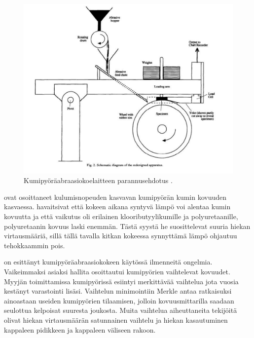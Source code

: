 \documentclass[12pt,a4paper,finnish]{tutthesis}
\begin{document}
\begin{figure}
  \begin{center}
    \includegraphics[scale=0.6]{redesign}
  \end{center}
  \caption[Koelaitteen parannusehdotus]{Kumipyöräabraasiokoelaitteen parannusehdotus \parencite[s.~234]{Stevenson1996}.}
  \label{fig:redesign}
\end{figure}


\textcite{avery1981analysis,borik1970rubber} ovat osoittaneet kulumisnopeuden
kasvavan kumipyörän kumin kovuuden kasvaessa. \textcite{Stevenson1996}
havaitsivat että kokeen aikana syntyvä lämpö voi alentaa kumin kovuutta ja
että vaikutus oli erilainen klooributyylikumille ja polyuretaanille, polyuretaanin
kovuus laski enemmän. Tästä syystä he suosittelevat suuria hiekan virtausmääriä,
sillä tällä tavalla kitkan kokeessa synnyttämä lämpö ohjautuu tehokkaammin pois.

\textcite{merkle2008} on esittänyt kumipyöräabraasiokokeen
käytössä ilmenneitä ongelmia. Vaikeimmaksi asiaksi hallita
osoittautui kumipyörien vaihtelevat kovuudet. Myyjän toimittamissa
kumipyörissä esiintyi merkittävää vaihtelua jota vuosia kestänyt
varastointi lisäsi. Vaihtelun minimointiin Merkle antaa ratkaisuksi
ainoastaan useiden kumipyörien tilaamisen, jolloin kovuusmittarilla
saadaan seulottua kelpoisat suuresta joukosta. Muita vaihtelua aiheuttaneita
tekijöitä olivat hiekan virtausmäärän satunnainen vaihtelu ja
hiekan kasautuminen kappaleen pidikkeen ja kappaleen väliseen
rakoon.
\end{document}
